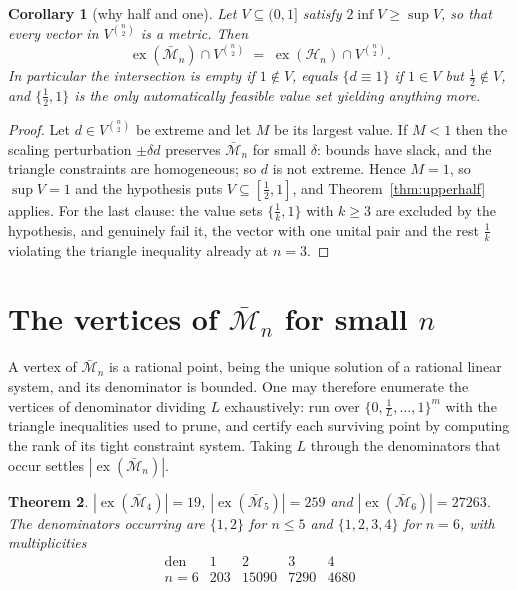\documentclass[11pt]{article}
\newtheorem{theorem}{Theorem}[section]
\newtheorem{corollary}[theorem]{Corollary}
\theoremstyle{definition}
\theoremstyle{remark}
\newcommand{\bM}{\bar{\mathcal{M}}}
\newcommand{\Ha}{\mathcal{H}}
\newcommand{\ex}{\operatorname{ex}}
\newcommand{\den}{\operatorname{den}}
\begin{document}
\begin{corollary}[why half and one]\label{cor:valuesets}
Let $V\subseteq(0,1]$ satisfy $2\inf V\geq\sup V$, so that every vector in
$V^{\binom n2}$ is a metric. Then
\[
\ex(\bM_n)\cap V^{\binom n2}\;=\;\ex(\Ha_n)\cap V^{\binom n2}.
\]
In particular the intersection is empty if $1\notin V$, equals $\{d\equiv1\}$ if $1\in V$
but $\tfrac12\notin V$, and $\{\tfrac12,1\}$ is the only automatically feasible value set
yielding anything more.
\end{corollary}

\begin{proof}
Let $d\in V^{\binom n2}$ be extreme and let $M$ be its largest value. If $M<1$ then the
scaling perturbation $\pm\delta d$ preserves $\bM_n$ for small $\delta$: bounds have slack,
and the triangle constraints are homogeneous; so $d$ is not extreme. Hence $M=1$, so
$\sup V=1$ and the hypothesis puts $V\subseteq[\tfrac12,1]$, and
Theorem~\ref{thm:upperhalf} applies. For the last clause: the value sets $\{\tfrac1k,1\}$
with $k\geq3$ are excluded by the hypothesis, and genuinely fail it, the vector with one
unital pair and the rest $\tfrac1k$ violating the triangle inequality already at $n=3$.
\end{proof}

\section{The vertices of $\bM_n$ for small $n$}
\label{sec:census}

A vertex of $\bM_n$ is a rational point, being the unique solution of a rational linear
system, and its denominator is bounded. One may therefore enumerate the vertices of
denominator dividing $L$ exhaustively: run over $\{0,\tfrac1L,\ldots,1\}^m$ with the
triangle inequalities used to prune, and certify each surviving point by computing the rank
of its tight constraint system. Taking $L$ through the denominators that occur settles
$|\ex(\bM_n)|$.

\begin{theorem}\label{thm:census}
$|\ex(\bM_4)|=19$, $|\ex(\bM_5)|=259$ and $|\ex(\bM_6)|=27263$. The denominators occurring
are $\{1,2\}$ for $n\leq5$ and $\{1,2,3,4\}$ for $n=6$, with multiplicities
\[
\begin{array}{r|rrrr}
\den & 1 & 2 & 3 & 4\\\hline
n=6 & 203 & 15090 & 7290 & 4680
\end{array}
\]
\end{theorem}
\end{document}
